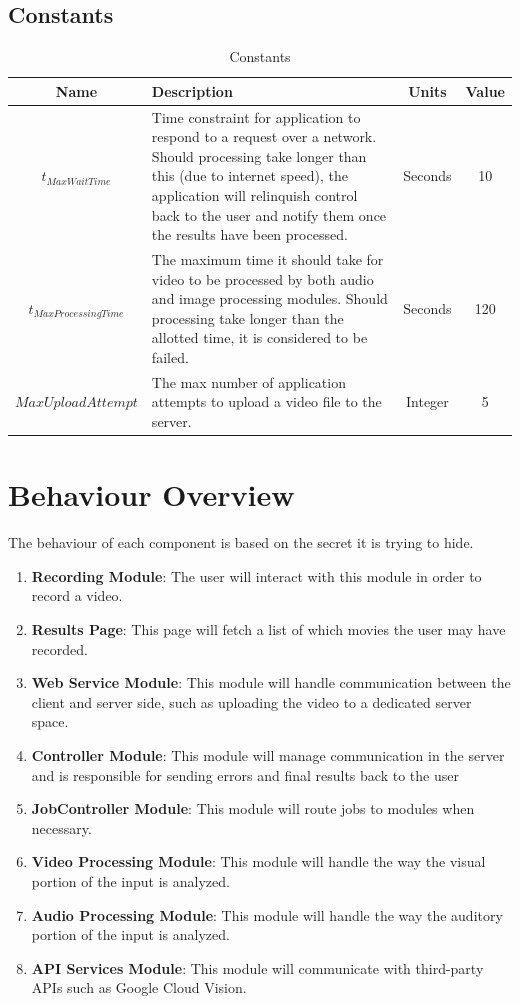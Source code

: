 \documentclass{article}
\begin{document}
\subsection{Constants}

\begin{table}[H]
    \caption{Constants}
    \centering
    \begin{tabularx}{\textwidth}{|c|X|c|c|}
        \hline
        \textbf{Name} & \textbf{Description} & \textbf{Units} & \textbf{Value}\\
        \hline
        $t_{MaxWaitTime}$ & Time constraint for application to respond to a request over a network. Should processing take longer than this (due to internet speed), the application will relinquish control back to the user and notify them once the results have been processed. & Seconds & 10 \\
        \hline
        $t_{MaxProcessingTime}$ & The maximum time it should take for video to be processed by both audio and image processing modules. Should processing take longer than the allotted time, it is considered to be failed. & Seconds & 120 \\
        \hline
        $MaxUploadAttempt$ & The max number of application attempts to upload a video file to the server. & Integer & 5 \\
        \hline
    \end{tabularx}
    \label{tab:Constants}
\end{table}

\section{Behaviour Overview}
The behaviour of each component is based on the secret it is trying to hide. 
\begin{enumerate}
    \item \textbf{Recording Module}: The user will interact with this module in order to record a video.
    \item \textbf{Results Page}: This page will fetch a list of which movies the user may have recorded.
    \item \textbf{Web Service Module}: This module will handle communication between the client and server side, such as uploading the video to a dedicated server space.
    \item \textbf{Controller Module}: This module will manage communication in the server and is responsible for sending errors and final results back to the user
    \item \textbf{JobController Module}: This module will route jobs to modules when necessary.
    \item \textbf{Video Processing Module}: This module will handle the way the visual portion of the input is analyzed.
    \item \textbf{Audio Processing Module}: This module will handle the way the auditory portion of the input is analyzed.
    \item \textbf{API Services Module}: This module will communicate with third-party APIs such as Google Cloud Vision.
\end{enumerate}
\end{document}
